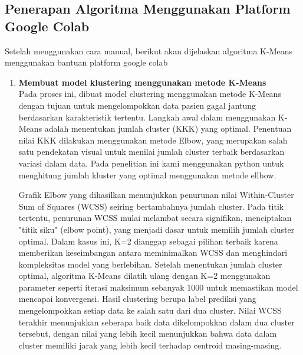 \documentclass[english,12pt,a4paper,openany]{book}
\begin{document}
	
	\subsection{Penerapan Algoritma Menggunakan Platform Google Colab}
	
	Setelah menggunakan cara manual, berikut akan dijelaskan algoritma K-Means menggunakan bantuan platform google colab 
	
	\begin{enumerate}
		\item \textbf{Membuat model klustering menggunakan metode K-Means} \\
		
		
		
		
		Pada proses ini, dibuat model clustering menggunakan metode K-Means dengan tujuan untuk mengelompokkan data pasien gagal jantung berdasarkan karakteristik tertentu. Langkah awal dalam menggunakan K-Means adalah menentukan jumlah cluster (KKK) yang optimal. Penentuan nilai KKK dilakukan menggunakan metode Elbow, yang merupakan salah satu pendekatan visual untuk menilai jumlah cluster terbaik berdasarkan variasi dalam data.  Pada penelitian ini kami menggunakan python untuk menghitung jumlah kluster yang optimal menggunakan metode ellbow. 
		
		Grafik Elbow yang dihasilkan menunjukkan penurunan nilai Within-Cluster Sum of Squares (WCSS) seiring bertambahnya jumlah cluster. Pada titik tertentu, penurunan WCSS mulai melambat secara signifikan, menciptakan "titik siku" (elbow point), yang menjadi dasar untuk memilih jumlah cluster optimal. Dalam kasus ini, K=2  dianggap sebagai pilihan terbaik karena memberikan keseimbangan antara meminimalkan WCSS dan menghindari kompleksitas model yang berlebihan.
		Setelah menentukan jumlah cluster optimal, algoritma K-Means dilatih ulang dengan K=2  menggunakan parameter seperti iterasi maksimum sebanyak 1000 untuk memastikan model mencapai konvergensi. Hasil clustering berupa label prediksi  yang mengelompokkan setiap data ke salah satu dari dua cluster. Nilai WCSS terakhir menunjukkan seberapa baik data dikelompokkan dalam dua cluster tersebut, dengan nilai yang lebih kecil menunjukkan bahwa data dalam cluster memiliki jarak yang lebih kecil terhadap centroid masing-masing.
		

\end{enumerate}
\end{document}
